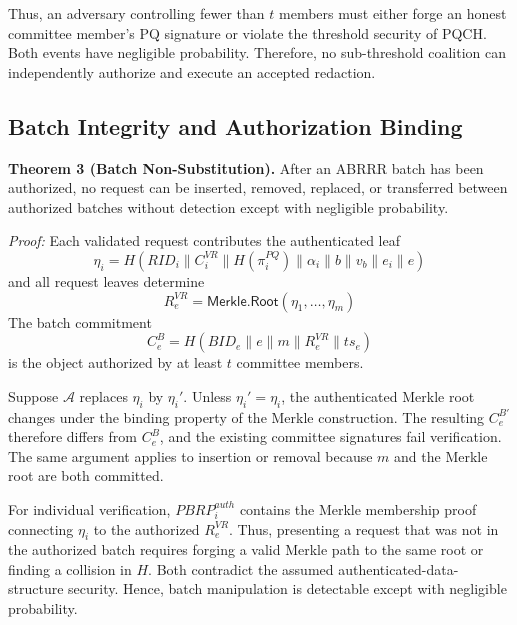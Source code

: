 \documentclass[lettersize,journal]{IEEEtran}
\begin{document}
    Thus, an adversary controlling fewer than $t$ members must either forge an honest committee member's PQ signature or violate the threshold security of PQCH. Both events have negligible probability.
    Therefore, no sub-threshold coalition can independently authorize and execute an accepted redaction.
     
    
    
    \subsection{Batch Integrity and Authorization Binding}
    
    \textbf{Theorem 3 (Batch Non-Substitution).}
    After an ABRRR batch has been authorized, no request can be inserted,
    removed, replaced, or transferred between authorized batches without
    detection except with negligible probability.
    
    \emph{Proof:}
    Each validated request contributes the authenticated leaf
    \begin{equation}
    \eta_i=
    H(RID_i\parallel C_i^{VR}\parallel H(\pi_i^{PQ})
    \parallel\alpha_i\parallel b\parallel v_b\parallel e_i {\parallel e})
    \label{eq:sec_batch_leaf}
    \end{equation}
    and all request leaves determine
    \begin{equation}
    R_e^{VR}=
    \mathsf{Merkle.Root}(\eta_1,\ldots,\eta_m)
    \label{eq:sec_batch_root}
    \end{equation}
    The batch commitment
    \begin{equation}
    C_e^B=
    H(BID_e\parallel e\parallel m\parallel
    R_e^{VR}\parallel ts_e)
    \label{eq:sec_batch_commit}
    \end{equation}
    is the object authorized by at least $t$ committee members.
    
    Suppose $\mathcal{A}$ replaces $\eta_i$ by $\eta_i'$. Unless
    $\eta_i'=\eta_i$, the authenticated Merkle root changes under the
    binding property of the Merkle construction. The resulting
    $C_e^{B'}$ therefore differs from $C_e^B$, and the existing committee
    signatures fail verification. The same argument applies to insertion
    or removal because $m$ and the Merkle root are both committed.
    
    For individual verification, $PBRP_i^{auth}$ contains the Merkle
    membership proof connecting $\eta_i$ to the authorized
    $R_e^{VR}$. Thus, presenting a request that was not in the authorized
    batch requires forging a valid Merkle path to the same root or finding
    a collision in $H$. Both contradict the assumed authenticated-data-
    structure security. Hence, batch manipulation is detectable except
    with negligible probability.
     
\end{document}
